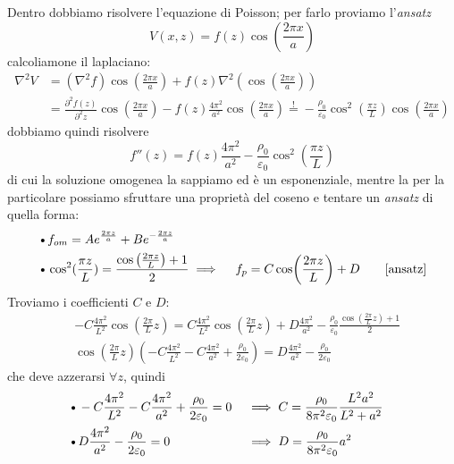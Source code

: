 Dentro dobbiamo risolvere l'equazione di Poisson; per farlo proviamo l'\textit{ansatz}
\begin{equation}
  V(x,z) = f(z) \cos (\frac{2\pi x}{a})
\end{equation}
calcoliamone il laplaciano:
\begin{align}
  \nabla^2 V &= (\nabla^2 f) \cos (\frac{2\pi x}{a}) + f(z) \nabla^2 \left( \cos (\frac{2\pi x}{a}) \right) \\
  &= \frac{\partial ^2 f(z) }{\partial ^2 z } \cos (\frac{2\pi x}{a}) - f(z) \frac{4\pi^2}{a^2} \cos (\frac{2\pi x}{a}) 
  \overset{!}{=} -\frac{\rho_0}{\varepsilon_0} \cos^2(\frac{\pi z}{L}) \cos (\frac{2\pi x}{a})
\end{align}
dobbiamo quindi risolvere
\begin{equation}
  f''(z) = f(z) \frac{4\pi^2}{a^2} -\frac{\rho_0}{\varepsilon_0} \cos^2(\frac{\pi z}{L})
\end{equation}
di cui la soluzione omogenea la sappiamo ed è un esponenziale, mentre la per la particolare possiamo sfruttare una proprietà del coseno e tentare 
un \textit{ansatz} di quella forma:
\begin{align}
  &\text{\textbullet} f_{om} = A e^{\frac{2\pi z}{a}} + B e^{-\frac{2\pi z}{a}}
  \\
  &\text{\textbullet} \cos^2(\frac{\pi z}{L}) = \frac{\cos\left( \frac{2\pi z}{L} \right) + 1}{2}  \implies \quad f_p = C \cos\! \left( \frac{2\pi z}{L} \right) + D \tag*{[ansatz]}
\end{align}
Troviamo i coefficienti $ C $ e $ D $:
\begin{align}
  &-C \frac{4\pi^2}{L^2} \cos \! \left( \frac{2\pi}{L} z \right)  = C \frac{4\pi^2}{L^2} \cos \! \left( \frac{2\pi}{L} z \right) + D \frac{4\pi^2}{a^2} 
  - \frac{\rho_0}{\varepsilon_0} \frac{ \cos\!\left( \frac{2\pi}{L}z \right) +1 }{2}
  \\
  &\cos\!\left( \frac{2\pi}{L} z \right) \left( -C \frac{4\pi^2}{L^2} -C \frac{4\pi^2}{a^2} + \frac{\rho_0}{2\varepsilon_0}\right) = D\frac{4\pi^2}{a^2} - \frac{\rho_0}{2\varepsilon_0}
\end{align}
che deve azzerarsi $ \forall z $, quindi
\begin{align}
  &\text{\textbullet} -C \frac{4\pi^2}{L^2} -C \frac{4\pi^2}{a^2} + \frac{\rho_0}{2\varepsilon_0} = 0 &&\implies C = \frac{\rho_0}{8\pi^2 \varepsilon_0} \frac{L^2 a^2}{L^2 + a^2} &&
  \\
  &\text{\textbullet} D\frac{4\pi^2}{a^2} - \frac{\rho_0}{2\varepsilon_0} = 0 &&\implies D = \frac{\rho_0}{8\pi^2 \varepsilon_0} a^2 &&
\end{align}

